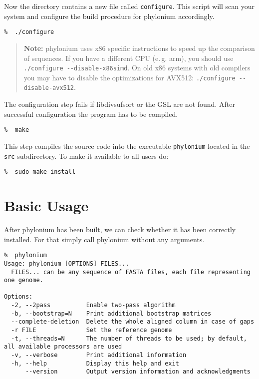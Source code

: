 \documentclass[a4paper,10pt,english]{scrartcl}
\newcommand{\tool}[1]{\textsf{#1}}
\newcommand{\phylonium}{\textsf{phylonium}\xspace}
\begin{document}
Now the directory contains a new file called \lstinline!configure!. This script will scan your system and configure the build procedure for \phylonium accordingly.

\begin{lstlisting}
%  ./configure
\end{lstlisting}

\begin{quotation}
\textbf{Note:} \phylonium uses x86 specific instructions to speed up the comparison of sequences. If you have a different CPU (e.\,g. arm), you should use \lstinline!./configure --disable-x86simd!. On old x86 systems with old compilers you may have to disable the optimizations for AVX512: \lstinline!./configure --disable-avx512!.
\end{quotation}

The configuration step fails if \tool{libdivsufsort} or the \tool{GSL} are not found. After successful configuration the program has to be compiled.

\begin{lstlisting}
%  make
\end{lstlisting}

This step compiles the source code into the executable \lstinline!phylonium! located in the \lstinline!src! subdirectory. To make it available to all users do:

\begin{lstlisting}
%  sudo make install
\end{lstlisting}


\section{Basic Usage}

After \phylonium has been built, we can check whether it has been correctly installed. For that simply call \phylonium without any arguments.

\begin{lstlisting}
%  phylonium
Usage: phylonium [OPTIONS] FILES...
  FILES... can be any sequence of FASTA files, each file representing one genome.

Options:
  -2, --2pass          Enable two-pass algorithm
  -b, --bootstrap=N    Print additional bootstrap matrices
  --complete-deletion  Delete the whole aligned column in case of gaps
  -r FILE              Set the reference genome
  -t, --threads=N      The number of threads to be used; by default, all available processors are used
  -v, --verbose        Print additional information
  -h, --help           Display this help and exit
      --version        Output version information and acknowledgments
\end{lstlisting}
\end{document}
